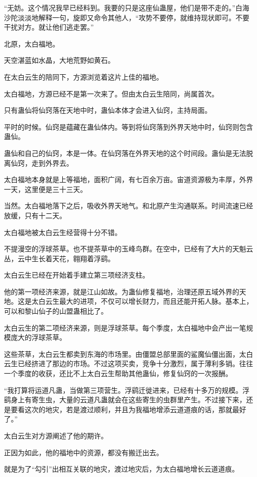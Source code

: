 \begin{this_body}
“无妨。这个情况我早已经料到。我要的只是这座仙蛊屋，他们是带不走的。”白海沙陀淡淡地解释一句，旋即又命令其他人，“攻势不要停，就维持现状即可。不要干扰对方。就让他们逃走罢。”

北原，太白福地。

天空湛蓝如水晶，大地荒野如黄石。

在太白云生的陪同下，方源浏览着这片上佳的福地。

太白福地，方源已经不是第一次来了。但由太白云生陪同，尚属首次。

只有蛊仙将仙窍落在天地中时，蛊仙本体才会进入仙窍，主持局面。

平时的时候。仙窍是蕴藏在蛊仙体内。等到将仙窍落到外界天地中时，仙窍则包含蛊仙。

蛊仙和自己的仙窍，本是一体。在仙窍落在外界天地的这个时间段。蛊仙是无法脱离仙窍，走到外界去。

太白福地本身就是上等福地，面积广阔，有七百余万亩。宙道资源极为丰厚，外界一天，这里便是三十三天。

当然。太白福地落下之后，吸收外界天地气。和北原产生沟通联系。时间流速已经放缓，只有十二天。

太白福地被太白云生经营得十分不错。

不提漫空的浮球茶草。也不提茶草中的玉峰鸟群。在空中，已经有了大片的天魁云丛，云中生长着天花，翱翔着浮鹞。

太白云生已经在开始着手建立第三项经济支柱。

他的第一项经济来源，就是江山如故。为蛊仙修复福地，治理还原五域外界的天地。这是太白云生最大的进项，不仅可以增长财力，而且还能开拓人脉。基本上，可以和黎山仙子的山盟蛊相比了。

太白云生的第二项经济来源，则是浮球茶草。每个季度，太白福地中会产出一笔规模庞大的浮球茶草。

这些茶草，太白云生都卖到东海的市场里。由僵盟总部里面的鲨魔仙僵出面，太白云生已经挤进了那边的市场。不过这项买卖，竞争十分激烈，属于薄利多销。往往一个季度的收获，还比不上太白云生帮助其他蛊仙，修复仙窍的一次报酬。

“我打算将运道凡蛊，当做第三项营生。浮鹞迁徙进来，已经有十多万的规模。浮鹞身上有寄生虫，大量的云道凡蛊就会在这些寄生的虫群里产生。不过接下来，还是要看这次的地灾，若是渡过顺利，并且为我福地增添云道道痕的话，那就最好了。”

太白云生对方源阐述了他的期许。

正因为如此，他的福地中的资源，都没有搬迁出去。

就是为了“勾引”出相互关联的地灾，渡过地灾后，为太白福地增长云道道痕。


\end{this_body}
